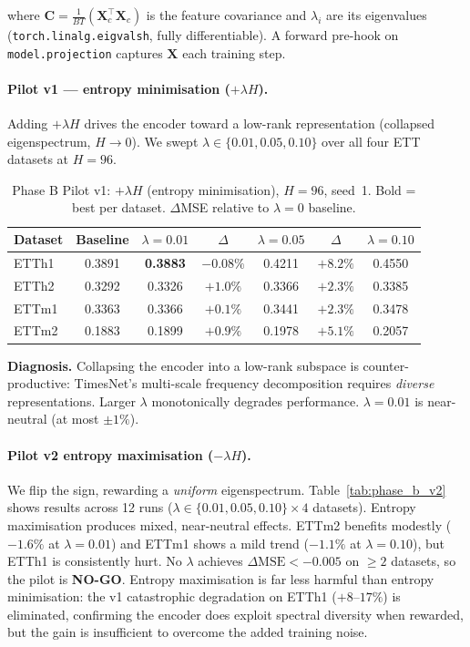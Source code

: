 \documentclass[10pt]{article}
\begin{document}
where $\mathbf{C} = \frac{1}{BT}(\mathbf{X}_c^\top \mathbf{X}_c)$ is the feature covariance
and $\lambda_i$ are its eigenvalues (\texttt{torch.linalg.eigvalsh}, fully differentiable).
A forward pre-hook on \texttt{model.projection} captures $\mathbf{X}$ each training step.

\paragraph{Pilot v1 — entropy minimisation ($+\lambda H$).}
Adding $+\lambda H$ drives the encoder toward a low-rank representation
(collapsed eigenspectrum, $H \to 0$).  We swept
$\lambda \in \{0.01, 0.05, 0.10\}$ over all four ETT datasets at $H=96$.

\begin{table}[h]
\centering\small
\caption{Phase B Pilot v1: $+\lambda H$ (entropy minimisation), $H=96$, seed~1.
Bold = best per dataset. $\Delta$MSE relative to $\lambda=0$ baseline.}
\label{tab:phase_b_v1}
\begin{tabular}{l c c c c c c}
\toprule
Dataset & Baseline & $\lambda{=}0.01$ & $\Delta$ & $\lambda{=}0.05$ & $\Delta$ & $\lambda{=}0.10$ \\
\midrule
ETTh1 & 0.3891 & \textbf{0.3883} & $-0.08\%$ & 0.4211 & $+8.2\%$ & 0.4550 \\
ETTh2 & 0.3292 & 0.3326 & $+1.0\%$ & 0.3366 & $+2.3\%$ & 0.3385 \\
ETTm1 & 0.3363 & 0.3366 & $+0.1\%$ & 0.3441 & $+2.3\%$ & 0.3478 \\
ETTm2 & 0.1883 & 0.1899 & $+0.9\%$ & 0.1978 & $+5.1\%$ & 0.2057 \\
\bottomrule
\end{tabular}
\end{table}

\noindent\textbf{Diagnosis.}
Collapsing the encoder into a low-rank subspace is
counter-productive: TimesNet's multi-scale frequency decomposition
requires \emph{diverse} representations.
Larger $\lambda$ monotonically degrades performance.
$\lambda=0.01$ is near-neutral (at most $\pm1\%$).

\paragraph{Pilot v2 \textemdash{} entropy maximisation ($-\lambda H$).}
We flip the sign, rewarding a \emph{uniform} eigenspectrum.
Table~\ref{tab:phase_b_v2} shows results across 12 runs
($\lambda \in \{0.01, 0.05, 0.10\} \times 4$ datasets).
Entropy maximisation produces mixed, near-neutral effects.
ETTm2 benefits modestly ($-1.6\%$ at $\lambda=0.01$) and ETTm1 shows a mild
trend ($-1.1\%$ at $\lambda=0.10$), but ETTh1 is consistently hurt.
No $\lambda$ achieves $\Delta\text{MSE} < -0.005$ on $\geq\!2$ datasets,
so the pilot is \textbf{NO-GO}.
Entropy maximisation is far less harmful than entropy minimisation:
the v1 catastrophic degradation on ETTh1 ($+8$--$17\%$) is eliminated,
confirming the encoder does exploit spectral diversity when rewarded,
but the gain is insufficient to overcome the added training noise.
\end{document}
